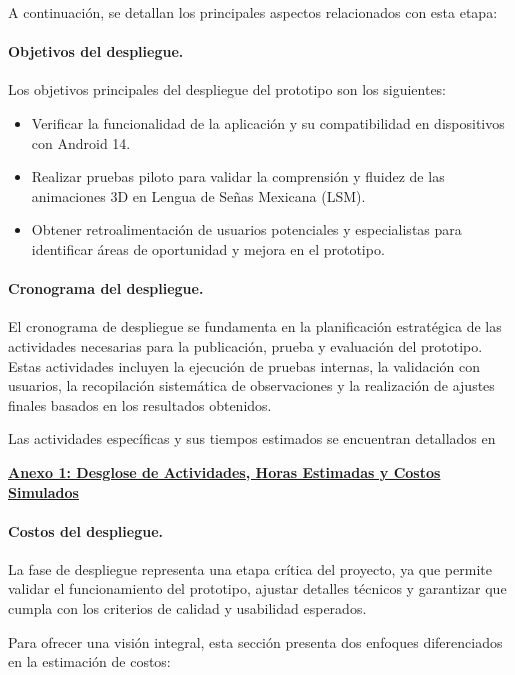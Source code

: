 A continuación, se detallan los principales aspectos relacionados con esta etapa:
\paragraph{\textbf{Objetivos del despliegue.}}
Los objetivos principales del despliegue del prototipo son los siguientes:

\begin{itemize}
	\item Verificar la funcionalidad de la aplicación y su compatibilidad en dispositivos con Android 14.
	\item Realizar pruebas piloto para validar la comprensión y fluidez de las animaciones 3D en Lengua de Señas Mexicana (LSM).
	\item Obtener retroalimentación de usuarios potenciales y especialistas para identificar áreas de oportunidad y mejora en el prototipo.
\end{itemize}

\paragraph{\textbf{Cronograma del despliegue.}}
El cronograma de despliegue se fundamenta en la planificación estratégica de las actividades necesarias para la publicación, prueba y evaluación del prototipo. Estas actividades incluyen la ejecución de pruebas internas, la validación con usuarios, la recopilación sistemática de observaciones y la realización de ajustes finales basados en los resultados obtenidos.

Las actividades específicas y sus tiempos estimados se encuentran detallados en \begin{flushleft} \href{https://correoipn-my.sharepoint.com/:x:/g/personal/jjuarezs2101_alumno_ipn_mx/EeARJhF0AGFBo4IQh_We0k0B-ua3S89CAl0FnxOvV31OnA?e=ynKN14}{\textbf{Anexo 1: Desglose de Actividades, Horas Estimadas y Costos Simulados}} \end{flushleft}

\paragraph{\textbf{Costos del despliegue.}}
La fase de despliegue representa una etapa crítica del proyecto, ya que permite validar el funcionamiento del prototipo, ajustar detalles técnicos y garantizar que cumpla con los criterios de calidad y usabilidad esperados.

Para ofrecer una visión integral, esta sección presenta dos enfoques diferenciados en la estimación de costos:

